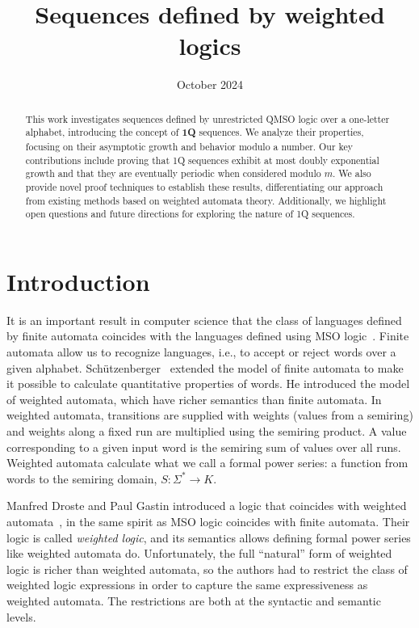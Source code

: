 \documentclass[en]{pracamgr}
\title{Sequences defined by weighted logics}
\date{October 2024}
\theoremstyle{definition}
\begin{document}
\maketitle

\begin{abstract}
    This work investigates sequences defined by unrestricted QMSO logic over a one-letter alphabet, introducing the concept of \textbf{1Q} sequences. We analyze their properties, focusing on their asymptotic growth and behavior modulo a number. Our key contributions include proving that 1Q sequences exhibit at most doubly exponential growth and that they are eventually periodic when considered modulo $m$. We also provide novel proof techniques to establish these results, differentiating our approach from existing methods based on weighted automata theory. Additionally, we highlight open questions and future directions for exploring the nature of 1Q sequences.
  \end{abstract}
  
\tableofcontents

\chapter{Introduction}
It is an important result in computer science that the class of languages defined by finite automata coincides with the languages defined using MSO logic~\cite{Buchi1960}. Finite automata allow us to recognize languages, i.e., to accept or reject words over a given alphabet. Sch{\"{u}}tzenberger~\cite{Schutzenberger61b} extended the model of finite automata to make it possible to calculate quantitative properties of words. He introduced the model of weighted automata, which have richer semantics than finite automata. In weighted automata, transitions are supplied with weights (values from a semiring) and weights along a fixed run are multiplied using the semiring product. A value corresponding to a given input word is the semiring sum of values over all runs. Weighted automata calculate what we call a formal power series: a function from words to the semiring domain, $S: \Sigma^* \rightarrow K$.

Manfred Droste and Paul Gastin introduced a logic that coincides with weighted automata~\cite{DrosteG07}, in the same spirit as MSO logic coincides with finite automata. Their logic is called \emph{weighted logic}, and its semantics allows defining formal power series like weighted automata do. Unfortunately, the full ``natural'' form of weighted logic is richer than weighted automata, so the authors had to restrict the class of weighted logic expressions in order to capture the same expressiveness as weighted automata. The restrictions are both at the syntactic and semantic levels.
\end{document}
